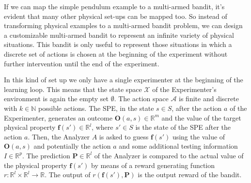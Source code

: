 \documentclass[11pt,a4paper,twoside]{report}
\newcommand{\+}{\textnormal{+} }
\theoremstyle{definition}
\numberwithin{equation}{chapter}
\begin{document}
\par If we can map the simple pendulum example to a multi-armed
bandit, it's evident that many other physical set-ups can be mapped too. So
instead of transforming physical examples to a multi-armed bandit problem, 
we can design a customizable multi-armed bandit to represent an infinite
variety of physical situations. This bandit is only useful to represent those
situations in which a discrete set of actions is chosen at the beginning of 
the experiment without further intervention until the end of the experiment.

In this kind of set up we only have a single experimenter at the beginning of
the learning loop. This means that the state space $\mathcal{X}$  of the
Experimenter's environment is again the empty set $\emptyset$. The action space
$\mathcal{A}$ is finite and discrete with $k \in \mathbb{N}$ possible actions.
The SPE, in the state $s \in S$, after the action $a$ of the Experimenter,
generates an outcome $\textbf{O}(a,s) \in \mathbb{R}^m$ and the value of the
target physical property $\textbf{f}(s') \in \mathbb{R}^l$, where $s' \in S$ is
the state of the SPE after the action $a$. Then, the Analyzer $A$ is asked to
guess $\textbf{f}(s')$ using the value of $\textbf{O}(a,s)$ and potentially the
action $a$ and some additional testing information $I \in  \mathbb{R}^{p}$. The
prediction $\textbf{P} \in \mathbb{R}^l$ of the Analyzer is compared to the
actual value of the physical property $\textbf{f}(s')$ by means of a reward
generating function $r:\mathbb{R}^l\times\mathbb{R}^l\rightarrow\mathbb{R}$. The
output of $r(\textbf{f}(s'),\textbf{P})$ is the output reward of the bandit.

\end{document}
